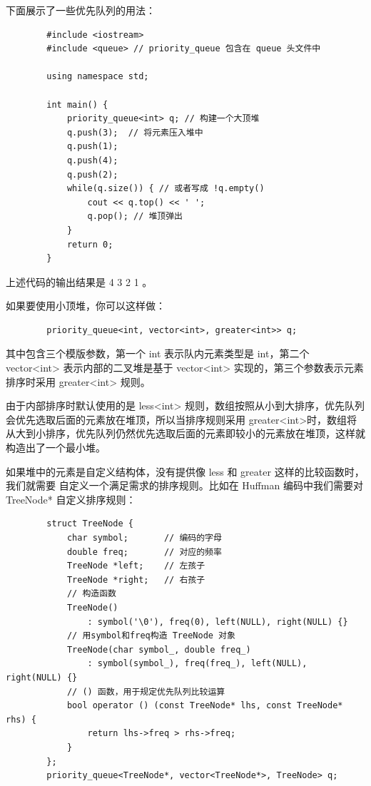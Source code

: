 \documentclass[12pt,a4paper]{article}
\begin{document}
下面展示了一些优先队列的用法：

\begin{lstlisting}
        #include <iostream>
        #include <queue> // priority_queue 包含在 queue 头文件中
        
        using namespace std;
        
        int main() {
            priority_queue<int> q; // 构建一个大顶堆
            q.push(3);  // 将元素压入堆中
            q.push(1);
            q.push(4);
            q.push(2);
            while(q.size()) { // 或者写成 !q.empty()
                cout << q.top() << ' ';
                q.pop(); // 堆顶弹出
            }
            return 0;
        }
\end{lstlisting}

上述代码的输出结果是 4 3 2 1 。

如果要使用小顶堆，你可以这样做：

\begin{lstlisting}
        priority_queue<int, vector<int>, greater<int>> q;
\end{lstlisting}

其中包含三个模版参数，第一个 int 表示队内元素类型是 int，第二个 vector<int> 表示内部的二叉堆是基于 vector<int> 实现的，第三个参数表示元素排序时采用 greater<int> 规则。

由于内部排序时默认使用的是 less<int> 规则，数组按照从小到大排序，优先队列会优先选取后面的元素放在堆顶，所以当排序规则采用 greater<int>时，数组将从大到小排序，优先队列仍然优先选取后面的元素即较小的元素放在堆顶，这样就构造出了一个最小堆。

如果堆中的元素是自定义结构体，没有提供像 less 和 greater 这样的比较函数时，我们就需要
自定义一个满足需求的排序规则。比如在 Huffman 编码中我们需要对 TreeNode* 自定义排序规则：

\begin{lstlisting}
        struct TreeNode {
            char symbol;       // 编码的字母
            double freq;       // 对应的频率
            TreeNode *left;    // 左孩子
            TreeNode *right;   // 右孩子
            // 构造函数
            TreeNode()
                : symbol('\0'), freq(0), left(NULL), right(NULL) {}
            // 用symbol和freq构造 TreeNode 对象
            TreeNode(char symbol_, double freq_)
                : symbol(symbol_), freq(freq_), left(NULL), right(NULL) {}
            // () 函数，用于规定优先队列比较运算
            bool operator () (const TreeNode* lhs, const TreeNode* rhs) {
                return lhs->freq > rhs->freq;
            }
        };
        priority_queue<TreeNode*, vector<TreeNode*>, TreeNode> q;
\end{lstlisting}
\end{document}
